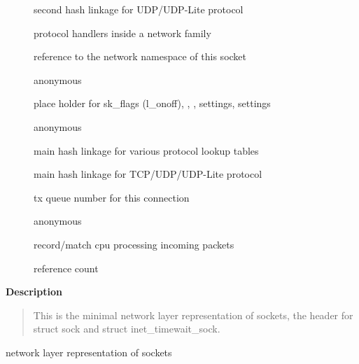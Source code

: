 \documentclass[a4paper,8pt,english]{sphinxmanual}
\begin{document}
\begin{description}
\item[{}] \leavevmode
second hash linkage for UDP/UDP-Lite protocol

\item[{}] \leavevmode
protocol handlers inside a network family

\item[{}] \leavevmode
reference to the network namespace of this socket

\item[{}] \leavevmode
anonymous

\item[{}] \leavevmode
place holder for sk\_flags
 (l\_onoff), , ,
 settings,  settings

\item[{}] \leavevmode
anonymous

\item[{}] \leavevmode
main hash linkage for various protocol lookup tables

\item[{}] \leavevmode
main hash linkage for TCP/UDP/UDP-Lite protocol

\item[{}] \leavevmode
tx queue number for this connection

\item[{}] \leavevmode
anonymous

\item[{}] \leavevmode
record/match cpu processing incoming packets

\item[{}] \leavevmode
reference count

\end{description}

\textbf{Description}
\begin{quote}

This is the minimal network layer representation of sockets, the header
for struct sock and struct inet\_timewait\_sock.
\end{quote}

\begin{fulllineitems}
\label{networking/kapi:c.sock}
network layer representation of sockets

\end{fulllineitems}
\end{document}
